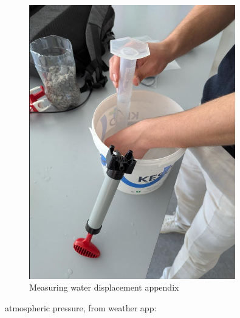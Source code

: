 \documentclass[12pt,a4paper]{article}
\begin{document}
\begin{figure}[H]
\centering
\includegraphics[width=0.8\textwidth]{measuring water sicplacment appendix.png}
\caption{Measuring water displacement appendix}
\label{fig:water_displacement_appendix}
\end{figure}
atmospheric pressure, from weather app:
\end{document}
